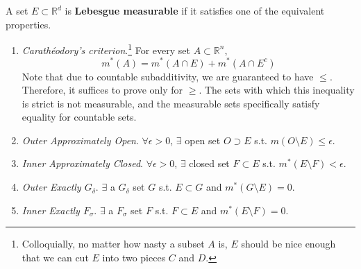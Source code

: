   \begin{definition}
    A set $E \subset \mathbb{R}^d$ is \textbf{Lebesgue measurable} if it satisfies one of the equivalent properties. 
    \begin{enumerate}
      \item \textit{Carathéodory's criterion}.\footnote{Colloquially, no matter how nasty a subset $A$ is, $E$ should be nice enough that we can cut $E$ into two pieces $C$ and $D$.} For every set $A \subset \mathbb{R}^n$, 
      \begin{equation}
        m^\ast (A) = m^\ast (A \cap E) + m^\ast (A \cap E^c)
      \end{equation}
      Note that due to countable subadditivity, we are guaranteed to have $\leq$. Therefore, it suffices to prove only for $\geq$. The sets with which this inequality is strict is not measurable, and the measurable sets specifically satisfy equality for countable sets.

      \item \textit{Outer Approximately Open}. $\forall \epsilon > 0$, $\exists$ open set $O \supset E$  s.t. $m(O \setminus E) \leq \epsilon$. 

      \item \textit{Inner Approximately Closed}. $\forall \epsilon > 0$, $\exists$ closed set $F \subset E$ s.t. $m^\ast (E \setminus F) < \epsilon$.  

      \item \textit{Outer Exactly $G_\delta$}. $\exists$ a $G_\delta$ set $G$ s.t. $E \subset G$ and $m^\ast (G \setminus E) = 0$. 

      \item \textit{Inner Exactly $F_\sigma$}. $\exists$ a $F_\sigma$ set $F$ s.t. $F \subset E$ and $m^\ast (E \setminus F) = 0$. 
    \end{enumerate}
  \end{definition}
